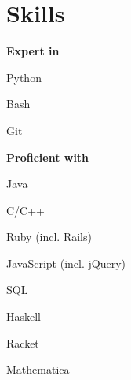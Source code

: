 \section{Skills}
\textbf{Expert in}
\vspace{\topsep} %
\begin{tightemize}
\item Python
\item Bash
\item Git
\end{tightemize}
\sectionsep

\textbf{Proficient with}
\begin{tightemize}
\item Java
\item C/C++
\item Ruby (incl. Rails)
\item JavaScript (incl. jQuery)
\item SQL
\item Haskell
\item Racket
\item Mathematica
\end{tightemize}
\sectionsep
